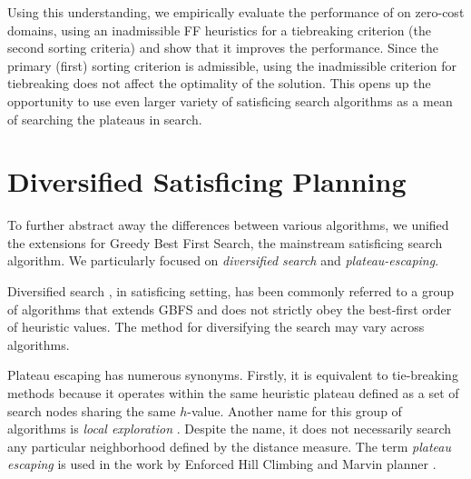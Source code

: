 
Using this understanding, we empirically evaluate the performance of \astar on zero-cost domains,
using an inadmissible FF heuristics \cite{Hoffmann01} for a tiebreaking criterion (the second
sorting criteria) and show that it improves the performance. Since the primary (first) sorting
criterion is admissible, using the inadmissible criterion for tiebreaking does not affect the
optimality of the solution. This opens up the opportunity to use even larger variety of satisficing
search algorithms as a mean of searching the plateaus in \astar search.

\section{Diversified Satisficing Planning}

\label{sec:sat}

To further abstract away the differences between various algorithms, we unified the extensions for
Greedy Best First Search, the mainstream satisficing search algorithm. We particularly focused on
\emph{diversified search} and \emph{plateau-escaping}.

Diversified search \cite{imai2011novel,valenzano2014comparison,xie14type}, in satisficing setting,
has been commonly referred to a group of algorithms that extends GBFS and does not strictly obey the
best-first order of heuristic values. The method for diversifying the search may vary
across algorithms.

Plateau escaping has numerous synonyms. Firstly, it is equivalent to tie-breaking
methods because it operates within the same heuristic plateau defined as a set of search nodes
sharing the same $h$-value. Another name for this group of algorithms is \emph{local exploration}
\cite{XieMH15,XieH14gbfsle}. Despite the name, it does not necessarily search any
particular neighborhood defined by the distance measure. The term \emph{plateau escaping} is used in
the work by Enforced Hill Climbing \cite{Hoffmann01} and Marvin planner \cite{Coles07}.

